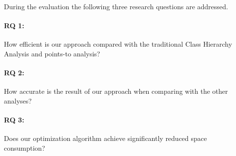 \documentclass{llncs}
\begin{document}
During the evaluation the following three research questions are addressed.

\paragraph{RQ 1:} How efficient is our approach compared with the traditional Class Hierarchy Analysis and points-to analysis?

\paragraph{RQ 2:} How accurate is the result of our approach when comparing with the other analyses?

\paragraph{RQ 3:} Does our optimization algorithm achieve significantly reduced space consumption?

\end{document}
